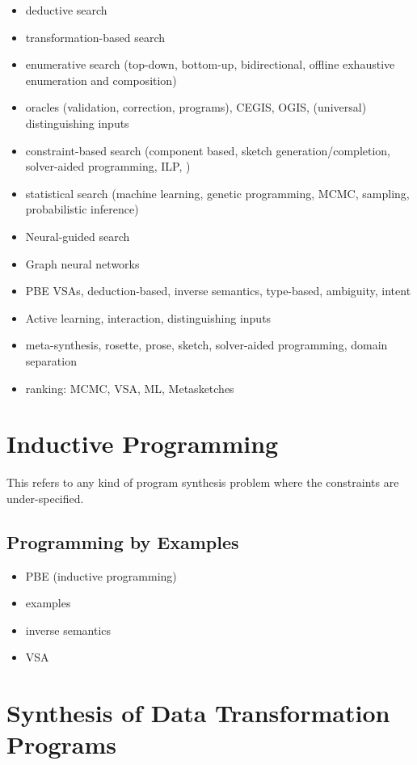 \begin{itemize}
\item deductive search
\item transformation-based search
\item enumerative search (top-down, bottom-up, bidirectional, offline exhaustive enumeration and composition)
\item oracles (validation, correction, programs), CEGIS, OGIS, (universal) distinguishing inputs
\item constraint-based search (component based, sketch generation/completion, solver-aided programming, ILP, )
\item statistical search (machine learning, genetic programming, MCMC, sampling, probabilistic inference)
\item Neural-guided search
\item Graph neural networks
\item PBE VSAs, deduction-based, inverse semantics, type-based, ambiguity, intent
\item Active learning, interaction, distinguishing inputs
\item meta-synthesis, rosette, prose, sketch, solver-aided programming, domain separation
\item ranking: MCMC, VSA, ML, Metasketches
\end{itemize}

\section{Inductive Programming}
\label{sec:inductive-programming}

This refers to any kind of program synthesis problem where the constraints are
under-specified.

\subsection{Programming by Examples}
\label{sec:pbe}

\begin{itemize}
\item PBE (inductive programming)
\item examples
\item inverse semantics
\item VSA
\end{itemize}

\section{Synthesis of Data Transformation Programs}
\label{sec:data-trans-synth}

